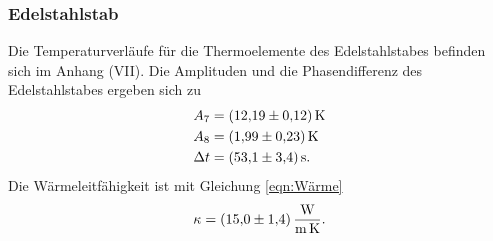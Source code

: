 \subsubsection{Edelstahlstab}
Die Temperaturverläufe für die Thermoelemente des Edelstahlstabes befinden sich im Anhang (VII).
Die Amplituden und die Phasendifferenz des Edelstahlstabes ergeben sich zu
\begin{align*}
    A_{7} &= \SI{12.19 \pm 0.12}{\kelvin} \\
    A_{8} &= \SI{1.99 \pm 0.23}{\kelvin} \\
    \Delta t &= \SI{53.1 \pm 3.4}{\second}.
\end{align*}
Die Wärmeleitfähigkeit ist mit Gleichung \eqref{eqn:Wärme}
\begin{equation*}
    \kappa = \SI{15.0 \pm 1.4}{\watt\per\meter\per\kelvin}.
\end{equation*}